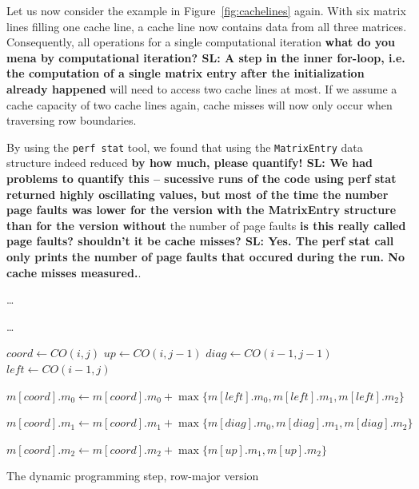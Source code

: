 \documentclass[runningheads,a4paper]{llncs}
\begin{document}
Let us now consider the example in Figure~\ref{fig:cachelines} again. 
With six matrix lines filling one cache line, a cache line now contains data from all three matrices. 
Consequently, all operations for a single computational iteration {\bf what do you mena by computational iteration? SL: A step in the inner for-loop, i.e. the computation of a single matrix entry after the initialization already happened} 
will need to access two cache lines at most. 
If we assume a cache capacity of two cache lines again, cache misses will now only occur when traversing row boundaries.

By using the \texttt{perf stat} tool, we found that using the \texttt{MatrixEntry} data structure indeed reduced {\bf by how much, please quantify! SL: We had problems to quantify this -- sucessive runs of the code using perf stat returned highly oscillating values, but most of the time the number page faults was lower for the version with the MatrixEntry structure than for the version without}
the number of page faults {\bf is this really called page faults? shouldn't it be cache misses? SL: Yes. The perf stat call only prints the number of page faults that occured during the run. No cache misses measured.}.

\begin{algorithm}

\ldots{}
 {
	 {
		\ldots{}
		
		$coord \gets CO(i, j)$\;	
		$up \gets CO(i, j-1)$\;
		$diag \gets CO(i-1, j-1)$\;		
		$left \gets CO(i-1, j)$\;
		
		$m[coord].m_0 \gets m[coord].m_0 + \max\{m[left].m_0, m[left].m_1, m[left].m_2\}$\;
		
		$m[coord].m_1 \gets m[coord].m_1 + \max\{m[diag].m_0, m[diag].m_1, m[diag].m_2\}$\;
		
		$m[coord].m_2 \gets m[coord].m_2 + \max\{m[up].m_1, m[up].m_2\}$\;
	}
}

\caption{The dynamic programming step, row-major version}
\label{alg:dp}
\end{algorithm}
\end{document}
